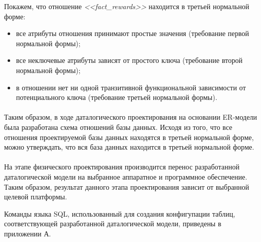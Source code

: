 Покажем, что отношение \textit{<<fact\_rewards>>} находится в третьей нормальной форме:
\begin{itemize}
\item
  все атрибуты отношения принимают простые значения
  (требование первой нормальной формы);
\item
  все неключевые атрибуты зависят от простого ключа
  (требование второй нормальной формы); 
\item
  в отношении нет ни одной транзитивной функциональной зависимости
  от потенциального ключа (требование третьей нормальной формы).
\end{itemize}

\paragraph{}
Таким образом, в ходе даталогического проектирования на основании ER-модели была разработана схема 
отношений базы данных.
Исходя из того, что все отношения проектируемой базы данных находятся в третьей нормальной форме,
можно утверждать, что вся база данных находится в третьей нормальной форме.

\paragraph{}
На этапе физического проектирования производится перенос разработанной
даталогической модели
на выбранное аппаратное и программное обеспечение.
Таким образом, результат данного этапа проектирования зависит от
выбранной целевой платформы.

Команды языка SQL, использованный для создания конфигупации таблиц,
соответствующей разработанной даталогической модели, 
приведены в приложении А.

